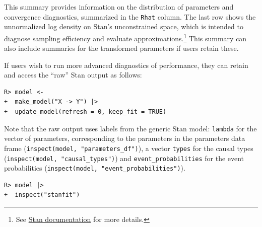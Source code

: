 \documentclass[
  11pt,
  article]{jss}
\begin{document}
This summary provides information on the distribution of parameters and
convergence diagnostics, summarized in the \texttt{Rhat} column. The
last row shows the unnormalized log density on Stan's unconstrained
space, which is intended to diagnose sampling efficiency and evaluate
approximations.\footnote{See
  \href{https://mc-stan.org/cmdstanr/reference/fit-method-lp.html}{Stan
  documentation} for more details.} This summary can also include
summaries for the transformed parameters if users retain these.

If users wish to run more advanced diagnostics of performance, they can
retain and access the ``raw'' Stan output as follows:

\begin{verbatim}
R> model <- 
+  make_model("X -> Y") |> 
+  update_model(refresh = 0, keep_fit = TRUE)
\end{verbatim}

Note that the raw output uses labels from the generic Stan model:
\texttt{lambda} for the vector of parameters, corresponding to the
parameters in the parameters data frame
(\texttt{inspect(model,\ "parameters\_df")}), a vector \texttt{types}
for the causal types (\texttt{inspect(model,\ "causal\_types")}) and
\texttt{event\_probabilities} for the event probabilities
(\texttt{inspect(model,\ "event\_probabilities")}).

\begin{verbatim}
R> model |> 
+  inspect("stanfit")
\end{verbatim}
\end{document}
